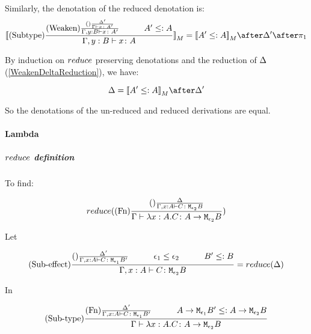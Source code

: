 {            Similarly, the denotation of the reduced denotation is:
            \begin{equation}
                \deno{\treerule{Subtype}{
                    \treerule{Weaken}{
                        \treerule{}{\D'}{\gtyperelation{x}{A'}}
                    } {
                        \typerelation{\gby}{x}{A'}
                    }
                    \s\s
                    A' \subtype A
                    }{\typerelation{\gby}{x}{A}}} = \deno{A'\subtype A}\after \D' \after \p
            \end{equation}


            By induction on $reduce$ preserving denotations and the reduction of $\Delta$ (\ref{WeakenDeltaReduction}), we have:

            \begin{equation}
                \D = \deno{A' \subtype A}\after\D'
            \end{equation}

            So the denotations of the un-reduced and reduced derivations are equal.

            \paragraph{Lambda}
            \subparagraph{$reduce$ definition}
                To find:
            
                \begin{equation}
                    reduce((\text{Fn}) \frac{
                        (\text{}) \frac{\Delta}{\Gamma, x: A \vdash C \colon \texttt{M}_{\epsilon_2}{B}}
                    }{\Gamma \vdash \lambda x : A. C \colon A \rightarrow \texttt{M}_{\epsilon_2}{B}})
                \end{equation}

                Let 

                \begin{equation}
                    \treerule{Sub-effect}{
                        \treerule{}{\D'}{\typerelation{\gax}{C}{\M{\e_1}{B'}}}
                        \s\s
                        \e_1\subeffect\e_2
                        \s\s
                        B' \subtype B
                    }{
                        \typerelation{\gax}{C}{\M{\e_2}{B}}
                    } = \reduce(\D)
                \end{equation}

                In

                \begin{equation}
                    \treerule{Sub-type}{
                        \treerule{Fn}{
                            \D'
                        }{
                            \typerelation{\gax}{C}{\M{\e_1}{B'}}
                        }
                        \s\s
                        \lamtype{A}{\e_1}{B'}\subtype\lamtype{A}{\e_2}{B}
                    } {
                        \gtyperelation{\lam{x}{A}{C}}{\lamtype{A}{\e_2}{B}}
                    }
                \end{equation}

}
